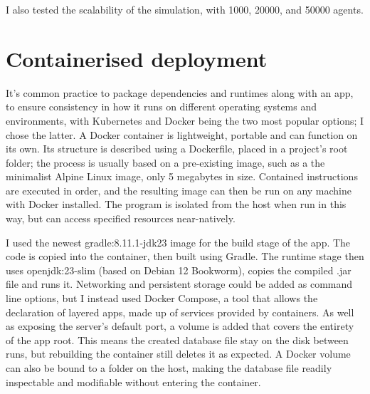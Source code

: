     


I also tested the scalability of the simulation, with 1000, 20000, and 50000 agents.

\section{Containerised deployment}
It's common practice to package dependencies and runtimes along with an app, to ensure consistency in how it runs on different operating systems and environments, with Kubernetes and Docker being the two most popular options; I chose the latter. A Docker container is lightweight, portable and can function on its own. Its structure is described using a Dockerfile, placed in a project's root folder; the process is usually based on a pre-existing image, such as a the minimalist Alpine Linux image, only 5 megabytes in size. Contained instructions are executed in order, and the resulting image can then be run on any machine with Docker installed. The program is isolated from the host when run in this way, but can access specified resources near-natively.

I used the newest gradle:8.11.1-jdk23 image for the build stage of the app. The code is copied into the container, then built using Gradle. The runtime stage then uses openjdk:23-slim (based on Debian 12 Bookworm), copies the compiled .jar file and runs it. Networking and persistent storage could be added as command line options, but I instead used Docker Compose, a tool that allows the declaration of layered apps, made up of services provided by containers. As well as exposing the server's default port, a volume is added that covers the entirety of the app root. This means the created database file stay on the disk between runs, but rebuilding the container still deletes it as expected. A Docker volume can also be bound to a folder on the host, making the database file readily inspectable and modifiable without entering the container.
